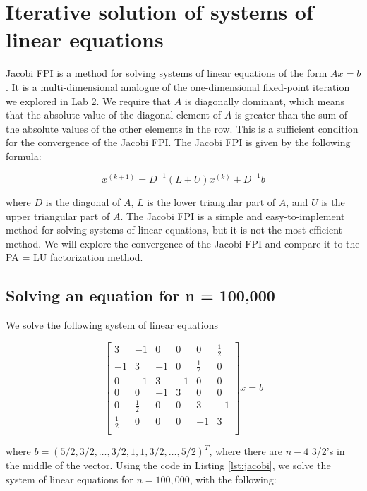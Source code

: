 \documentclass[11pt]{article}
\begin{document}
\section{Iterative solution of systems of linear equations}

Jacobi FPI is a method for solving systems of linear equations of the form $Ax = b$. It is a multi-dimensional analogue of the one-dimensional fixed-point iteration we explored in Lab 2. We require that $A$ is diagonally dominant, which means that the absolute value of the diagonal element of $A$ is greater than the sum of the absolute values of the other elements in the row. This is a sufficient condition for the convergence of the Jacobi FPI. The Jacobi FPI is given by the following formula:

\begin{equation}
x^{(k+1)} = D^{-1}(L+U)x^{(k)} + D^{-1}b
\end{equation}

where $D$ is the diagonal of $A$, $L$ is the lower triangular part of $A$, and $U$ is the upper triangular part of $A$. The Jacobi FPI is a simple and easy-to-implement method for solving systems of linear equations, but it is not the most efficient method. We will explore the convergence of the Jacobi FPI and compare it to the PA = LU factorization method.

\subsection{Solving an equation for n = 100,000}

We solve the following system of linear equations

\begin{equation}
\begin{bmatrix}
  3 & -1 & 0 & 0 & 0 & \frac{1}{2} \\
  -1 & 3 & -1 & 0 & \frac{1}{2} & 0 \\
  0 & -1 & 3 & -1 & 0 & 0 \\
  0 & 0 & -1 & 3 & 0 & 0 \\
  0 & \frac{1}{2} & 0 & 0 & 3 & -1 \\
  \frac{1}{2} & 0 & 0 & 0 & -1 & 3 \\
\end{bmatrix}x = b
\end{equation}

where $b = (5/2, 3/2, \dots, 3/2, 1, 1, 3/2, \dots, 5/2)^T$, where there are $n - 4$ 3/2's in the middle of the vector. Using the code in Listing \ref{lst:jacobi}, we solve the system of linear equations for $n = 100,000$, with the following:
\end{document}
